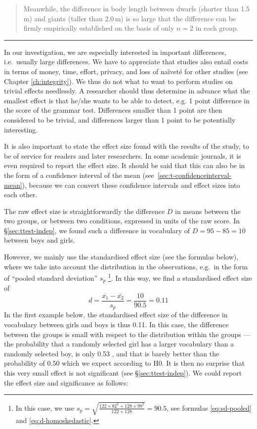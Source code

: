 \documentclass[
]{book}
\begin{document}
\begin{quote}
Meanwhile, the difference in body length between dwarfs (shorter than
1.5 m) and giants (taller than 2.0 m) is so large that the difference can be firmly
empirically established on the basis of only \(n=2\) in each group.
\end{quote}

\begin{center}\rule{0.5\linewidth}{0.5pt}\end{center}

In our investigation, we are especially interested in important
differences, i.e.~usually large differences. We have to appreciate
that studies also entail costs in terms of money, time,
effort, privacy, and loss of naïveté for other studies
(see Chapter
\ref{ch:integrity}). We thus do not what to want to perform studies
on trivial effects needlessly. A researcher should thus determine in advance
what the smallest effect is that he/she wants to be able to detect, e.g.
1 point difference in the score of the grammar test. Differences smaller than
1 point are then considered to be trivial, and differences larger than 1 point to be potentially
interesting.

It is also important to state the effect size found with the results
of the study, to be of service for readers and later
researchers. In some academic journals, it is even
required to report the effect size. It should be said that this
can also be in the form of a confidence interval of the mean
(see~\ref{sec:t-confidenceinterval-mean}), because we can
convert these confidence intervals and effect sizes into
each other.

The raw effect size is straightforwardly the difference \(D\) in means
between the two groups, or between two conditions, expressed in units
of the raw score. In §\ref{sec:ttest-indep}, we found such a difference
in vocabulary of \(D=95-85=10\) between boys and girls.

However, we mainly use the standardised effect size (see
the formulas below), where we take into account the distribution in
the observations, e.g.~in the form of ``pooled standard deviation'' \(s_p\) \footnote{In this case, we use \(s_p = \sqrt{ \frac{122\times82^2+128\times98^2} {122+128} } = 90.5\), see formulas
  \eqref{eq:sd-pooled} and \eqref{eq:d-homoskedastic}.}.
In this way, we find a standardised effect size of
\begin{equation}
  \label{eq:d-standardized}
    d = \frac{ \overline{x_1}-\overline{x_2} } {s_p} = \frac{10}{90.5} = 0.11
\end{equation}
In the first example below, the standardised effect size of the difference in
vocabulary between girls and boys is thus 0.11. In this case, the difference
between the groups is small with respect to the distribution
within the groups --- the probability that a randomly selected girl
has a larger vocabulary than a randomly selected boy, is only 0.53 \citep{McGraw92},
and that is barely better than the probability of 0.50 which we expect according to H0.
It is then no surprise that this very small effect is not significant
(see §\ref{sec:ttest-indep}). We could
report the effect size and significance as follows:
\end{document}
